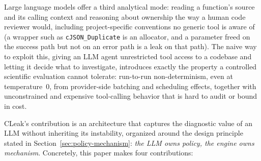 \documentclass[11pt,a4paper]{article}
\begin{document}
Large language models offer a third analytical mode: reading a function's
source and its calling context and reasoning about ownership the way a
human code reviewer would, including project-specific conventions no
generic tool is aware of (a wrapper such as \texttt{cJSON\_Duplicate} is an
allocator, and a parameter freed on the success path but not on an error path
is a leak on that path). The naive way to exploit this, giving an LLM
agent unrestricted tool access to a codebase and letting it decide what to
investigate, introduces exactly the property a controlled scientific
evaluation cannot tolerate: run-to-run non-determinism, even at
temperature~0, from provider-side batching and scheduling effects, together
with unconstrained and expensive tool-calling behavior that is hard to
audit or bound in cost.

CLeak's contribution is an architecture that captures the diagnostic value
of an LLM without inheriting its instability, organized around the design
principle stated in Section~\ref{sec:policy-mechanism}: \emph{the LLM owns
policy, the engine owns mechanism}. Concretely, this paper makes four
contributions:
\end{document}

